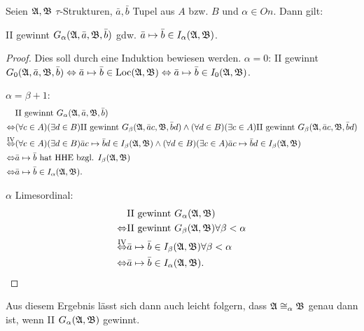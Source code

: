 \begin{lemma}
	Seien $\mathfrak{A},\mathfrak{B}$ $\tau$-Strukturen, $\bar{a},\bar{b}$ Tupel aus $A$ bzw. $B$ und $\alpha\in On$. Dann gilt:
	
	II gewinnt $G_\alpha(\mathfrak{A},\bar{a},\mathfrak{B},\bar{b})$ gdw. $\bar{a}\mapsto\bar{b}\in I_\alpha(\mathfrak{A},\mathfrak{B})$.
	\label{EquivGdw2gewinnt}
\end{lemma}
\begin{proof}
	Dies soll durch eine Induktion bewiesen werden.
	$\alpha=0$: II gewinnt $G_0(\mathfrak{A},\bar{a},\mathfrak{B},\bar{b}) \Leftrightarrow \bar{a}\mapsto\bar{b}\in \operatorname{Loc}(\mathfrak{A},\mathfrak{B}) \Leftrightarrow \bar{a}\mapsto\bar{b}\in I_0(\mathfrak{A},\mathfrak{B})$.
	
	$\alpha=\beta+1$:
	\begin{align*}
		&\text{II gewinnt } G_\alpha(\mathfrak{A},\bar{a},\mathfrak{B},\bar{b}) \\
		\Leftrightarrow & (\forall c \in A)(\exists d\in B) \text{II gewinnt } G_\beta(\mathfrak{A},\bar{a}c,\mathfrak{B},\bar{b}d) \land (\forall d \in B)(\exists c\in A) \text{II gewinnt } G_\beta(\mathfrak{A},\bar{a}c,\mathfrak{B},\bar{b}d) \\
		\overset{\text{IV}}{\Leftrightarrow} & (\forall c \in A)(\exists d\in B) \bar{a}c\mapsto\bar{b}d\in I_\beta(\mathfrak{A},\mathfrak{B}) \land (\forall d \in B)(\exists c\in A) \bar{a}c\mapsto\bar{b}d\in I_\beta(\mathfrak{A},\mathfrak{B}) \\
		\Leftrightarrow& \bar{a}\mapsto\bar{b} \text{ hat HHE bzgl. } I_\beta(\mathfrak{A},\mathfrak{B}) \\
		\Leftrightarrow& \bar{a}\mapsto \bar{b}\in I_\alpha(\mathfrak{A},\mathfrak{B}).
	\end{align*}
	
	$\alpha$ Limesordinal:
	\begin{align*}
		&\text{II gewinnt } G_\alpha(\mathfrak{A},\mathfrak{B}) \\
		\Leftrightarrow & \text{II gewinnt } G_\beta(\mathfrak{A},\mathfrak{B}) \forall \beta <\alpha \\
		\overset{\text{IV}}{\Leftrightarrow}& \bar{a}\mapsto\bar{b} \in I_\beta(\mathfrak{A},\mathfrak{B}) \forall \beta<\alpha \\
		\Leftrightarrow & \bar{a}\mapsto\bar{b}\in I_\alpha(\mathfrak{A},\mathfrak{B}).
	\end{align*}
\end{proof}

Aus diesem Ergebnis lässt sich dann auch leicht folgern, dass $\mathfrak{A}\cong_\alpha\mathfrak{B}$ genau dann ist, wenn II $G_\alpha(\mathfrak{A},\mathfrak{B})$ gewinnt.

